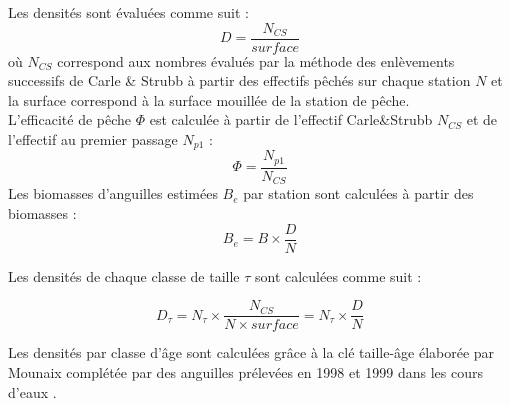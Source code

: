 \documentclass[10pt,twocolumn,titlepage,twoside]{article}\usepackage[]{graphicx}\usepackage[]{xcolor}
\begin{document}
Les densités sont évaluées comme suit :
\begin{equation*}
D=\frac{N_{CS}}{surface}
\end{equation*}
où $N_{CS}$ correspond aux nombres évalués par la
méthode des enlèvements successifs de Carle \& Strubb
\citep{ogle_fsa_2013,carle_new_1978} à partir des effectifs pêchés sur chaque 
station $N$ et la surface correspond à la surface mouillée de la
station de pêche.\\

L'efficacité de pêche $\Phi$ est calculée à partir de l'effectif
Carle\&Strubb $N_{CS}$ et de l'effectif au premier passage
$N_{p1}$ :
\begin{equation*}
\Phi=\frac{N_{p1}}{N_{CS}}
\end{equation*}
Les biomasses d'anguilles estimées
$B_e$
par station sont calculées à partir des biomasses :
\begin{equation*}
B_e=B\times \frac{D}{N}
\end{equation*}

Les densités de chaque classe de taille $\tau$ sont calculées comme
suit :

\begin{equation*}
 D_{\tau}=N_{\tau} \times \frac{N_{CS}}{N \times surface}= N_{\tau} \times \frac{D}{N}
\end{equation*}


Les densités par classe d'âge sont calculées grâce à la clé
taille-âge élaborée par Mounaix \citep{mounaix_intercalibration_1992} complétée par
des anguilles prélevées en 1998 et 1999 dans les cours
d'eaux \citep{briand_effect_2006}.
%
\end{document}
